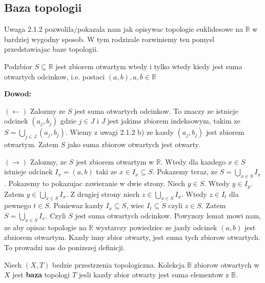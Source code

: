 \documentclass{article}
\begin{document}
\subsection{Baza topologii}

Uwaga 2.1.2 pozwolila/pokazala nam jak opisywac topologie euklidesowe na $\mathbb{R}$ w bardziej wygodny sposob. W tym rodzizale rozwiniemy ten pomysl przedstawiajac baze topologii.

\begin{tcolorbox}[colback=white!90!green,colframe=black!35!green,title=2.2.1 Lemat]
    Podzbior $S \subseteq \mathbb{R}$ jest zbiorem otwartym wtedy i tylko wtedy kiedy jest suma otwartych odcinkow, i.e. postaci $(a,b), a,b \in \mathbb{R}$

\end{tcolorbox}

\textbf{Dowod:}

$(\leftarrow)$ Zalozmy ze $S$ jest suma otwartych odcinkow. To znaczy ze istnieje odcinek $(a_{j}, b_{j})$ gdzie $j \in J$ i $J$ jest jakims zbiorem indeksowym, takim ze $S = \bigcup\limits_{j \in J}(a_{j}, b_{j})$. Wiemy z uwagi 2.1.2 b) ze kazdy $(a_{j}, b_{j})$ jest zbiorem otwartym. Zatem $S$ jako suma zbiorow otwartych jest otwarty.

$(\rightarrow)$ Zalozmy, ze $S$ jest zbiorem otwartym w $\mathbb{R}$. Wtedy dla kazdego $x \in S$ istnieje odcinek $I_{x} = (a,b)$ taki ze $x \in I_{x} \subseteq S$. Pokazemy teraz, ze $S = \bigcup\limits_{x \in S}I_{x}$.
Pokazemy to pokazujac zawieranie w dwie strony. 
Niech $y \in S$. Wtedy $y \in I_{y}$. Zatem $y \in \bigcup\limits_{x \in S}I_{x}$. Z drugiej strony niech $z \in \bigcup\limits_{x \in S}I_{x}$. Wtedy $z \in I_{t}$ dla pewnego $t \in S$. Poniewaz kazdy $I_{x} \subseteq S$, wiec $I_{t} \subseteq S$ czyli $z\in S$. Zatem $S = \bigcup\limits_{x \in S}I_{x}$. Czyli $S$ jest suma otwartych odcinkow. 
\vspace{5mm}
Powyzszy lemat mowi nam, ze aby opisac topologie na $\mathbb{R}$ wystarczy powiedziec ze jazdy odcinek $(a,b)$ jest zbziorem otwartym. Kazdy inny zbior otwarty, jest suma tych zbiorow otwartych. To prowadzi nas do ponizszej definicji.

\begin{tcolorbox}[colback=white!90!red,colframe=black!35!red,title=2.2.2 Definicja: Baza topologii]

    Niech $(X,T)$ bedzie przestrzenia topologiczna. Kolekcja $\mathbb{B}$ zbiorow otwartych w $X$ jest \textbf{baza} topologi $T$ jesli kazdy zbior otwarty jest suma elementow z $\mathbb{B}$.

\end{tcolorbox}
\end{document}

